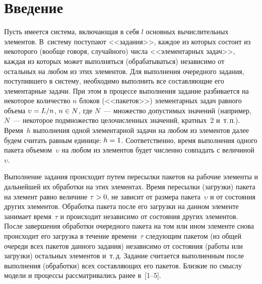       \begin{multicols}{2}

            \label{st\stat}

\section{Введение}

     Пусть имеется система, включающая в себя $l$ основных 
вычислительных элементов. В~систему поступают <<задания>>, каждое из 
которых состоит из некоторого (вообще говоря, случайного) числа   
<<элементарных задач>>, каждая из которых может выполняться 
(обрабатываться) независимо от остальных на любом из этих элементов. Для 
выполнения очередного задания, поступившего в систему, необходимо 
выполнить все составляющие его элементарные задачи. При этом в процессе 
выполнения задание разбивается на некоторое количество $n$  блоков 
(<<пакетов>>) элементарных задач равного объема $\upsilon\hm=L/n$, 
$n\hm\in N$, где $N$~--- множество допустимых значений  (например, 
$N$~---  некоторое подмножество целочисленных значений, кратных~2 
и~т.\,п.). Время~$h$ выполнения одной элементарной задачи на любом из 
элементов далее будем считать равным единице: $h\hm=1$. Соответственно, 
время выполнения одного пакета объемом~$\upsilon$ на любом из элементов 
будет численно совпадать с величиной~$\upsilon$. 
{

}
     
     Выполнение задания происходит путем пересылки пакетов на рабочие 
элементы и дальнейшей их обработки на этих элементах. Время пересылки 
(загрузки) пакета на элемент равно величине $\tau\hm>0$, не зависит от 
размера пакета~$\upsilon$ и от состояния других элементов. Обработка пакета 
после его загрузки на данном элементе занимает время~$\tau$ и происходит 
независимо от состояния других элементов. После завершения обработки 
очередного пакета на том или ином элементе снова происходит его загрузка в 
течение времени~$\tau$ следующим пакетом (из общей очереди всех пакетов 
данного задания) независимо от состояния (работы или загрузки) остальных 
элементов и~т.\,д. Задание считается выполненным после выполнения 
(обработки) всех составляющих его пакетов. Близкие по смыслу модели и 
процессы рассматривались ранее в~[1--5].
     

\end{multicols}
